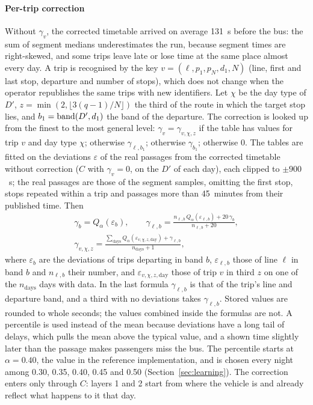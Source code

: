 \paragraph{Per-trip correction} Without $\gamma_v$, the corrected timetable arrived on average 131~s before the bus:
the sum of segment medians underestimates the run, because segment times are right-skewed, and some trips leave late
or lose time at the same place almost every day. A trip is recognised by the key $v=(\ell,p_1,p_N,d_1,N)$ (line, first
and last stop, departure and number of stops), which does not change when the operator republishes the same trips with
new identifiers. Let $\chi$ be the day type of $D'$, $z=\min(2,\lfloor3(q-1)/N\rfloor)$ the third of the route in
which the target stop lies, and $b_1=\operatorname{band}(D',d_1)$ the band of the departure. The correction is looked up from the
finest to the most general level: $\gamma_v=\gamma_{v,\chi,z}$ if the table has values for trip $v$ and day type
$\chi$; otherwise $\gamma_{\ell,b_1}$; otherwise $\gamma_{b_1}$; otherwise 0. The tables are fitted on the deviations
$\varepsilon$ of the real passages from the corrected timetable without correction ($C$ with $\gamma_v=0$, on the $D'$
of each day), each clipped to $\pm900$~s; the real passages are those of the segment samples, omitting the first stop,
stops repeated within a trip and passages more than 45~minutes from their published time. Then
\begin{gather}
\gamma_b=Q_\alpha(\varepsilon_b),\qquad
\gamma_{\ell,b}=\frac{n_{\ell,b}\,Q_\alpha(\varepsilon_{\ell,b})+20\,\gamma_b}{n_{\ell,b}+20},\nonumber\\
\gamma_{v,\chi,z}=\frac{\sum_{\text{days}}Q_\alpha(\varepsilon_{v,\chi,z,\text{day}})+\gamma_{\ell,b}}{n_{\text{days}}+1},
\label{eq:trip-offsets}
\end{gather}
where $\varepsilon_b$ are the deviations of trips departing in band $b$, $\varepsilon_{\ell,b}$ those of line $\ell$ in
band $b$ and $n_{\ell,b}$ their number, and $\varepsilon_{v,\chi,z,\text{day}}$ those of trip $v$ in third $z$ on one
of the $n_{\text{days}}$ days with data. In the last formula $\gamma_{\ell,b}$ is that of the trip's line and departure
band, and a third with no deviations takes $\gamma_{\ell,b}$. Stored values are rounded to whole seconds; the values
combined inside the formulas are not. A percentile is used instead of the mean because deviations have a long tail of
delays, which pulls the mean above the typical value, and a shown time slightly later than the passage makes
passengers miss the bus. The percentile starts at $\alpha=0.40$, the value in the reference implementation, and is
chosen every night among 0.30, 0.35, 0.40, 0.45 and 0.50 (Section~\ref{sec:learning}). The correction enters only
through $C$: layers 1 and 2 start from where the vehicle is and already reflect what happens to it that day.

